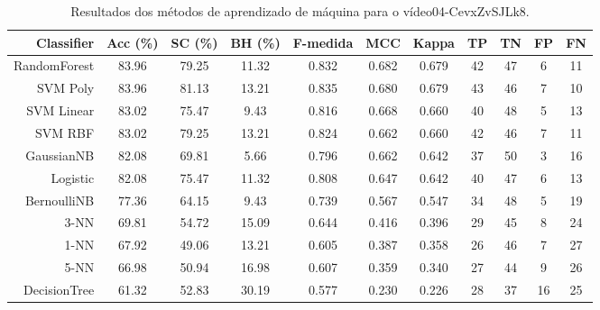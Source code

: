 \begin{table}[!htb]
\centering
\caption{Resultados dos métodos de aprendizado de máquina para o vídeo04-CevxZvSJLk8.}
\label{tab:04-CevxZvSJLk8}
\begin{tabular}{r|c|c|c|c|c|c|c|c|c|c}
\hline\hline
Classifier & Acc (\%) & SC (\%) & BH (\%) & F-medida & MCC & Kappa & TP & TN & FP & FN \\ \hline
RandomForest & 83.96 & 79.25 & 11.32 & 0.832 & 0.682 & 0.679 & 42 & 47 & 6 & 11 \\ 
SVM Poly & 83.96 & 81.13 & 13.21 & 0.835 & 0.680 & 0.679 & 43 & 46 & 7 & 10 \\ 
SVM Linear & 83.02 & 75.47 & 9.43 & 0.816 & 0.668 & 0.660 & 40 & 48 & 5 & 13 \\ 
SVM RBF & 83.02 & 79.25 & 13.21 & 0.824 & 0.662 & 0.660 & 42 & 46 & 7 & 11 \\ 
GaussianNB & 82.08 & 69.81 & 5.66 & 0.796 & 0.662 & 0.642 & 37 & 50 & 3 & 16 \\ 
Logistic & 82.08 & 75.47 & 11.32 & 0.808 & 0.647 & 0.642 & 40 & 47 & 6 & 13 \\ 
BernoulliNB & 77.36 & 64.15 & 9.43 & 0.739 & 0.567 & 0.547 & 34 & 48 & 5 & 19 \\ 
3-NN & 69.81 & 54.72 & 15.09 & 0.644 & 0.416 & 0.396 & 29 & 45 & 8 & 24 \\ 
1-NN & 67.92 & 49.06 & 13.21 & 0.605 & 0.387 & 0.358 & 26 & 46 & 7 & 27 \\ 
5-NN & 66.98 & 50.94 & 16.98 & 0.607 & 0.359 & 0.340 & 27 & 44 & 9 & 26 \\ 
DecisionTree & 61.32 & 52.83 & 30.19 & 0.577 & 0.230 & 0.226 & 28 & 37 & 16 & 25 \\ 
\hline\hline
\end{tabular}
\end{table}
